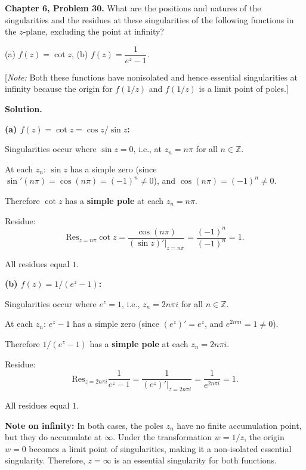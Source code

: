 \documentclass[12pt]{article}
\begin{document}
\textbf{Chapter 6, Problem 30.} What are the positions and natures of the singularities and the residues at these singularities of the following functions in the $z$-plane, excluding the point at infinity?

(a) $f(z) = \cot z$, \qquad (b) $f(z) = \dfrac{1}{e^z - 1}$.

[\textit{Note:} Both these functions have nonisolated and hence essential singularities at infinity because the origin for $f(1/z)$ and $f(1/z)$ is a limit point of poles.]

\bigskip
\textbf{Solution.}

\textbf{(a) $f(z) = \cot z = \cos z / \sin z$:}

Singularities occur where $\sin z = 0$, i.e., at $z_n = n\pi$ for all $n \in \mathbb{Z}$.

At each $z_n$: $\sin z$ has a simple zero (since $\sin'(n\pi) = \cos(n\pi) = (-1)^n \neq 0$), and $\cos(n\pi) = (-1)^n \neq 0$.

Therefore $\cot z$ has a \textbf{simple pole} at each $z_n = n\pi$.

Residue:
\[
\text{Res}_{z=n\pi}\cot z = \frac{\cos(n\pi)}{(\sin z)'|_{z=n\pi}} = \frac{(-1)^n}{(-1)^n} = 1.
\]

All residues equal $1$.

\textbf{(b) $f(z) = 1/(e^z-1)$:}

Singularities occur where $e^z = 1$, i.e., $z_n = 2n\pi i$ for all $n \in \mathbb{Z}$.

At each $z_n$: $e^z - 1$ has a simple zero (since $(e^z)' = e^z$, and $e^{2n\pi i} = 1 \neq 0$).

Therefore $1/(e^z-1)$ has a \textbf{simple pole} at each $z_n = 2n\pi i$.

Residue:
\[
\text{Res}_{z=2n\pi i}\frac{1}{e^z-1} = \frac{1}{(e^z)'|_{z=2n\pi i}} = \frac{1}{e^{2n\pi i}} = 1.
\]

All residues equal $1$.

\textbf{Note on infinity:} In both cases, the poles $z_n$ have no finite accumulation point, but they do accumulate at $\infty$. Under the transformation $w = 1/z$, the origin $w = 0$ becomes a limit point of singularities, making it a non-isolated essential singularity. Therefore, $z = \infty$ is an essential singularity for both functions.
\end{document}
